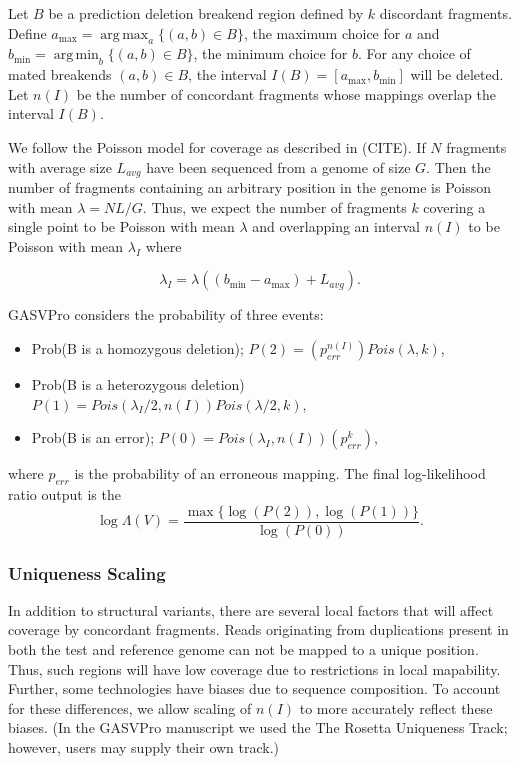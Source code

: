 \documentclass[11pt]{article}
\DeclareMathOperator*{\argmax}{arg\,max}
\DeclareMathOperator*{\argmin}{arg\,min}
\begin{document}
Let $B$ be a prediction deletion breakend region defined by $k$ discordant fragments.  Define $a_{\max} = \argmax_{a} \{(a,b) \in B\}$, the maximum choice for $a$ and $b_{\min} = \argmin_{b} \{(a,b) \in B\}$, the minimum choice for $b$. For any choice of mated breakends $(a,b) \in B$, the interval $I(B) = [a_{\max},b_{\min}]$ will be deleted.  Let $n(I)$ be the number of concordant fragments whose mappings overlap the interval $I(B)$.  

We follow the Poisson model for coverage as described in (CITE). If $N$ fragments with average size $L_{avg}$ have been sequenced from a genome of size $G$. Then the number of fragments containing an arbitrary position in the genome is Poisson with mean $\lambda = NL/G$. Thus, we expect the number of fragments $k$ covering a single point to be Poisson with mean $\lambda$ and overlapping an interval $n(I)$ to be Poisson with mean $\lambda_{I}$ where

$$\lambda_{I} = \lambda( (b_{\min} - a_{\max}) + L_{avg}).$$

GASVPro considers the probability of three events: 
\begin{itemize}
\item Prob(B is a homozygous deletion); $P(2) = \left( p_{err}^{n(I)} \right) Pois(\lambda, k)$,
\item Prob(B is a heterozygous deletion) $P(1) = Pois\left(\lambda_I/2, n(I) \right) Pois(\lambda/2, k)$, 
\item Prob(B is an error); $P(0)  = Pois\left(\lambda_I, n(I) \right) \left( p_{err}^{k}\right),$
\end{itemize}

\noindent where $p_{err}$ is the probability of an erroneous mapping. The final log-likelihood ratio output is the 
\begin{equation}
\log \Lambda(V) = \frac{\max \{\log( P(2) ), \log(P(1)) \}}{ \log(P(0))}.
\end{equation}


\subsubsection{Uniqueness Scaling}
In addition to structural variants, there are several local factors that will affect coverage by concordant fragments. Reads originating from duplications present in both the test and reference genome can not be mapped to a unique position. Thus, such regions will have low coverage due to restrictions in local mapability. Further, some technologies have biases due to sequence composition. To account for these differences, we allow scaling of $n(I)$ to more accurately reflect these biases. (In the GASVPro manuscript we used the The Rosetta Uniqueness Track; however, users may supply their own track.) 
\end{document}
